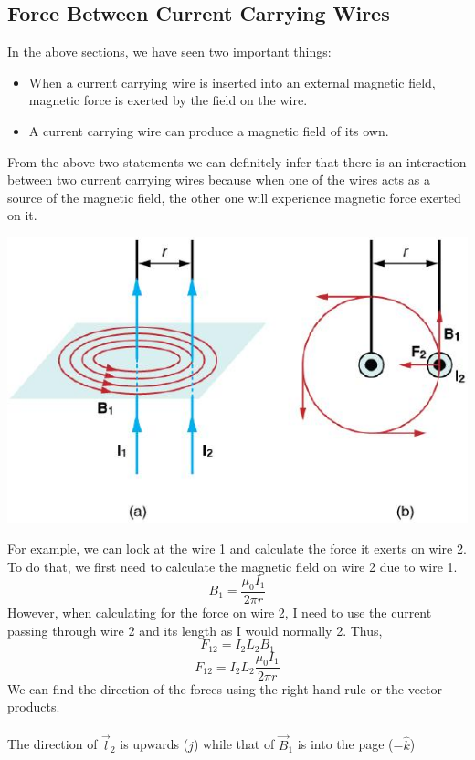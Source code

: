 \documentclass[9pt]{article}
\begin{document}
	 \subsection*{Force Between Current Carrying Wires}
	 In the above sections, we have seen two important things: 
	 \begin{itemize}
	 	\item When a current carrying wire is inserted into an external magnetic field, magnetic force is exerted by the field on the wire.
	 	\item A current carrying wire can produce a magnetic field of its own.
	 \end{itemize}
 	 From the above two statements we can definitely infer that there is an interaction between two current carrying wires because when one of the wires acts as a source of the magnetic field, the other one will experience magnetic force exerted on it. \\
 	 \begin{center}
 	 	\includegraphics*[scale=0.7]{two_wires.jpg}
 	 \end{center}
  	 For example, we can look at the wire 1 and calculate the force it exerts on wire 2. To do that, we first need to calculate the magnetic field on wire 2 due to wire 1.
  	 $$B_1=\dfrac{\mu_0I_1}{2\pi r}$$
  	 However, when calculating for the force on wire 2, I need to use the current passing through wire 2 and its length as I would normally 2. Thus,
  	 $$F_{12}=I_2L_2B_1$$
  	 $$F_{12}=I_2L_2\dfrac{\mu_0I_1}{2\pi r}$$
  	 We can find the direction of the forces using the right hand rule or the vector products. \\ \\
  	 The direction of $\vec{l}_2$ is upwards ($\hat{j}$) while that of $\vec{B}_1$ is into the page ($-\hat{k}$)  
\end{document}
